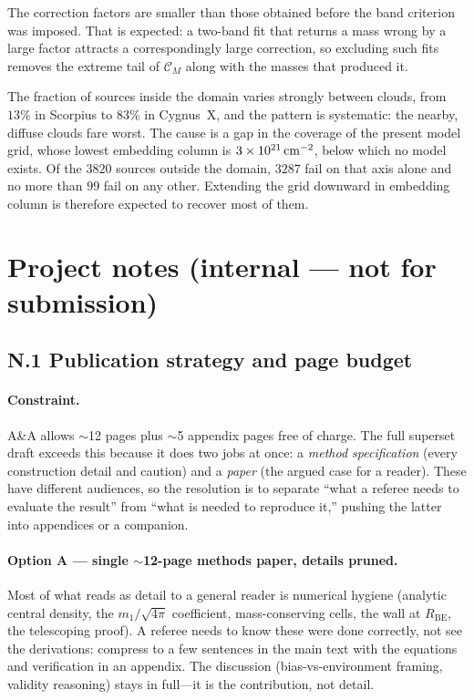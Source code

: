 \documentclass[11pt,a4paper]{article}
\providecommand{\CM}{\mathcal{C}_{M}}
\newcommand{\Rbe}{R_{\mathrm{BE}}}
\begin{document}
The correction factors are smaller than those obtained before the band
criterion was imposed. That is expected: a two-band fit that returns a mass
wrong by a large factor attracts a correspondingly large correction, so
excluding such fits removes the extreme tail of $\CM$ along with the masses
that produced it.

The fraction of sources inside the domain varies strongly between clouds, from
$13\%$ in Scorpius to $83\%$ in Cygnus~X, and the pattern is systematic: the
nearby, diffuse clouds fare worst. The cause is a gap in the coverage of the
present model grid, whose lowest embedding column is
$3\times10^{21}\,{\rm cm^{-2}}$, below which no model exists. Of the $3820$
sources outside the domain, $3287$ fail on that axis alone and no more than
$99$ fail on any other. Extending the grid downward in embedding column is
therefore expected to recover most of them.

\section*{Project notes (internal --- not for submission)}

\subsection*{N.1 \quad Publication strategy and page budget}

\paragraph{Constraint.} A\&A allows $\sim$12 pages plus $\sim$5 appendix
pages free of charge. The full superset draft exceeds this because it does
two jobs at once: a \emph{method specification} (every construction detail
and caution) and a \emph{paper} (the argued case for a reader). These have
different audiences, so the resolution is to separate ``what a referee needs
to evaluate the result'' from ``what is needed to reproduce it,'' pushing
the latter into appendices or a companion.

\paragraph{Option A --- single $\sim$12-page methods paper, details pruned.}
Most of what reads as detail to a general reader is numerical hygiene
(analytic central density, the $m_{1}/\sqrt{4\pi}$ coefficient,
mass-conserving cells, the wall at $\Rbe$, the telescoping proof). A referee
needs to know these were done correctly, not see the derivations: compress
to a few sentences in the main text with the equations and verification in
an appendix. The discussion (bias-vs-environment framing, validity
reasoning) stays in full---it is the contribution, not detail.
\end{document}
